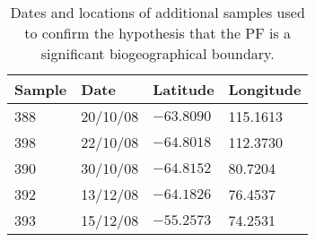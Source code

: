 \begin{table}
\caption[Additional samples used to confirm \ac{PF} hypothesis]{Dates and locations of additional samples used to confirm the hypothesis that the \ac{PF} is a significant biogeographical boundary.}
\label{tab:additionalsamples}
\smallskip
\begin{center}
\begin{tabular}{llll}
\toprule
\textbf{Sample} & \textbf{Date} & \textbf{Latitude} & \textbf{Longitude}\\
\midrule
388 & 20/10/08 & $-63.8090$ & 115.1613\\
398 & 22/10/08 & $-64.8018$ & 112.3730\\
390 & 30/10/08 & $-64.8152$ & 80.7204\\
392 & 13/12/08 & $-64.1826$ & 76.4537\\
393 & 15/12/08 & $-55.2573$ & 74.2531\\
\bottomrule
\end{tabular}
\end{center}
\end{table}
